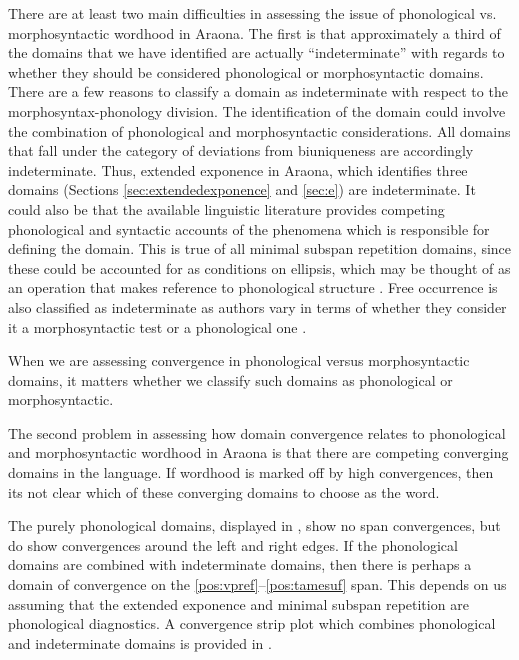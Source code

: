 \documentclass[output=paper,hidelinks]{langscibook}
\begin{document}
There are at least two main difficulties in assessing the issue of phonological vs. morphosyntactic wordhood in Araona. The first is that approximately a third of the domains that we have identified are actually ``indeterminate'' with regards to whether they should be considered phonological or morphosyntactic domains. There are a few reasons to classify a domain as indeterminate with respect to the morphosyntax-phonology division. The identification of the domain could involve the combination of phonological and morphosyntactic considerations. All domains that fall under the category of deviations from biuniqueness are accordingly indeterminate. Thus, extended exponence in Araona, which identifies three domains (Sections \ref{sec:extendedexponence} and \ref{sec:e}) are indeterminate. It could also be that the available linguistic literature provides competing phonological and syntactic accounts of the phenomena which is responsible for defining the domain. This is true of all minimal subspan repetition domains, since these could be accounted for as conditions on ellipsis, which may be thought of as an operation that makes reference to phonological structure \citep{Szczegielniak2018}. Free occurrence is also classified as indeterminate as authors vary in terms of whether they consider it a morphosyntactic test \citep{haspelmathword:2011} or a phonological one \citep{zingler2020wordhood}.

When we are assessing convergence in phonological versus morphosyntactic domains, it matters whether we classify such domains as phonological or morphosyntactic. 

The second problem in assessing how domain convergence relates to phonological and morphosyntactic wordhood in Araona is that there are competing converging domains in the language. If wordhood is marked off by high convergences, then its not clear which of these converging domains to choose as the word.  

The purely phonological domains, displayed in , show no span convergences, but do show convergences around the left and right edges. If the phonological domains are combined with indeterminate domains, then there is perhaps a domain of convergence on the \ref{pos:vpref}--\ref{pos:tamesuf} span. This depends on us assuming that the extended exponence and minimal subspan repetition are phonological diagnostics. A convergence strip plot which combines phonological and indeterminate domains is provided in .
\end{document}
